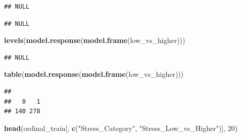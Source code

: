 \documentclass[
]{article}
\newenvironment{Shaded}{\begin{snugshade}}{\end{snugshade}}
\newcommand{\DecValTok}[1]{\textcolor[rgb]{0.00,0.00,0.81}{#1}}
\newcommand{\FunctionTok}[1]{\textcolor[rgb]{0.13,0.29,0.53}{\textbf{#1}}}
\newcommand{\NormalTok}[1]{#1}
\newcommand{\SpecialCharTok}[1]{\textcolor[rgb]{0.81,0.36,0.00}{\textbf{#1}}}
\newcommand{\StringTok}[1]{\textcolor[rgb]{0.31,0.60,0.02}{#1}}
\begin{document}
\begin{Shaded}
\end{Shaded}

\begin{verbatim}
## NULL
\end{verbatim}

\begin{Shaded}
\end{Shaded}

\begin{verbatim}
## NULL
\end{verbatim}

\begin{Shaded}
\begin{Highlighting}[]
\FunctionTok{levels}\NormalTok{(}\FunctionTok{model.response}\NormalTok{(}\FunctionTok{model.frame}\NormalTok{(low\_vs\_higher)))}
\end{Highlighting}
\end{Shaded}

\begin{verbatim}
## NULL
\end{verbatim}

\begin{Shaded}
\begin{Highlighting}[]
\FunctionTok{table}\NormalTok{(}\FunctionTok{model.response}\NormalTok{(}\FunctionTok{model.frame}\NormalTok{(low\_vs\_higher)))}
\end{Highlighting}
\end{Shaded}

\begin{verbatim}
## 
##   0   1 
## 140 278
\end{verbatim}

\begin{Shaded}
\begin{Highlighting}[]
\FunctionTok{head}\NormalTok{(ordinal\_train[, }\FunctionTok{c}\NormalTok{(}\StringTok{"Stress\_Category"}\NormalTok{, }\StringTok{"Stress\_Low\_vs\_Higher"}\NormalTok{)], }\DecValTok{20}\NormalTok{)}
\end{Highlighting}
\end{Shaded}
\end{document}
